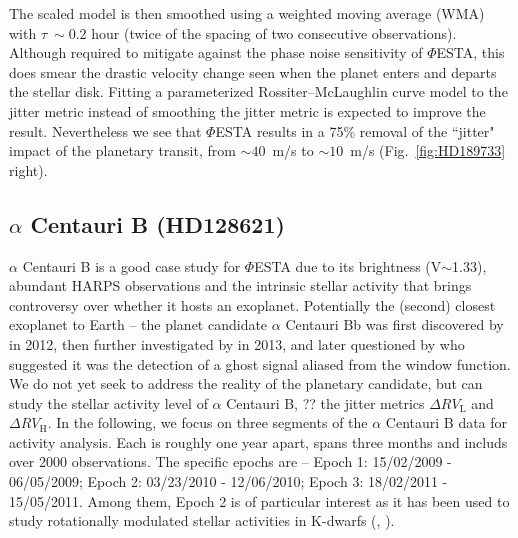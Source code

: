The scaled model is then smoothed using a weighted moving average (WMA) with $\tau~\sim0.2$ hour (twice of the spacing of two consecutive observations). Although required to mitigate against the phase noise sensitivity of $\mathit{\Phi}$ESTA, this does smear the drastic velocity change seen when the planet enters and departs the stellar disk. Fitting a parameterized Rossiter–McLaughlin curve model to the jitter metric instead of smoothing the jitter metric is expected to improve the result. Nevertheless we see that $\mathit{\Phi}$ESTA results in a 75\% removal of the ``jitter" impact of the planetary transit, from $\sim 40$~m/s to $\sim 10$~m/s (Fig.~\ref{fig:HD189733} right). 


%
%

\subsection{$\alpha$ Centauri B (HD128621)}

$\alpha$ Centauri B is a good case study for $\mathit{\Phi}$ESTA due to its brightness (V$\sim$1.33), abundant HARPS observations and the intrinsic stellar activity that brings controversy over whether it hosts an exoplanet. Potentially the (second) closest exoplanet to Earth -- the planet candidate $\alpha$ Centauri Bb was first discovered by \cite{Dumusque_Centauri_B} in 2012, then further investigated by \cite{Hatzes2013} in 2013, and later questioned by \cite{Rajpaul_Alpha_Cen_B} who suggested it was the detection of a ghost signal aliased from the window function. We do not yet seek to address the reality of the planetary candidate, but can study the stellar activity level of $\alpha$ Centauri B, ?? the jitter metrics $\Delta RV_\text{L}$ and $\Delta RV_\text{H}$. In the following, we focus on three segments of the $\alpha$ Centauri B data for activity analysis. Each is roughly one year apart, spans three months and includs over 2000 observations. The specific epochs are -- Epoch 1: 15/02/2009 - 06/05/2009; Epoch 2: 03/23/2010 - 12/06/2010; Epoch 3: 18/02/2011 - 15/05/2011. Among them, Epoch 2 is of particular interest as it has been used to study rotationally modulated stellar activities in K-dwarfs (\cite{Thompson2017MNRAS}, \cite{Wise2018}). 

